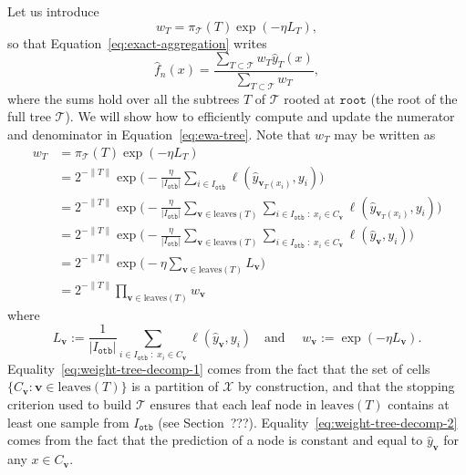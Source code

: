 \documentclass{article}
\newcommand{\wh}{\widehat}
\newcommand{\pp}{\; : \; }
\newcommand{\cX}{\mathcal X}
\newcommand{\otb}{\mathtt{otb}}
\newcommand{\pred}{\widehat{y}}
\newcommand{\node}{\mathbf{v}} %
\newcommand{\leaves}{\mathrm{leaves}} %
\renewcommand{\root}{\mathtt{root}} %
\newcommand{\tree}{\mathcal{T}} %
\begin{document}
Let us introduce 
\begin{equation*}
w_T = \pi_\tree (T) \exp (- \eta L_T),
\end{equation*}
so that Equation~\eqref{eq:exact-aggregation} writes
\begin{equation}
\label{eq:ewa-tree}
\wh f_n(x) = \frac{\sum_{T \subset \tree} w_T \pred_{T} (x)}{\sum_{T \subset \tree} w_T},
\end{equation}
where the sums hold over all the subtrees $T$ of $\tree$ rooted at $\root$ (the root of the full tree $\tree$).
We will show how to efficiently compute and update the numerator and denominator in Equation~\eqref{eq:ewa-tree}.
Note that $w_T$ may be written as
\begin{align}
    \nonumber
    w_T &= \pi_\tree (T) \exp(- \eta L_T) \\
    \nonumber
    &= 2^{-\| T \|} \exp \bigg(- \frac{\eta}{|I_\otb|} \sum_{i \in I_\otb} \ell (\pred_{\node_T(x_i)}, y_i) \bigg) \\
    \label{eq:weight-tree-decomp-1} 
    &= 2^{-\| T \|} \exp \bigg(- \frac{\eta}{|I_\otb|} \sum_{\node \in \leaves(T)} 
    \sum_{i \in I_\otb \pp x_i \in C_\node} \ell (\pred_{\node_T(x_i)}, y_i) \bigg) \\
    \label{eq:weight-tree-decomp-2}
    &= 2^{-\| T \|} \exp \bigg(- \frac{\eta}{|I_\otb|} \sum_{\node \in \leaves(T)} 
    \sum_{i \in I_\otb \pp x_i \in C_\node} \ell (\pred_{\node}, y_i) \bigg) \\
    \nonumber
    &= 2^{-\| T \|} \exp \bigg(- \eta \sum_{\node \in \leaves(T)} L_\node \bigg) \\
    \label{eq:weight-tree-decomp-3}
    &= 2^{-\| T \|} \prod_{\node \in \leaves(T)} w_{\node}
\end{align}
where
\begin{equation}
    \label{eq:node_loss_and_weight}
 L_\node := \frac{1}{|I_\otb|} \sum_{i \in I_\otb \pp x_i \in C_\node} \ell (\pred_{\node}, y_i)
 \quad \text{and } \quad w_\node := \exp(-\eta L_\node).
\end{equation}
Equality~\eqref{eq:weight-tree-decomp-1} comes from the fact that the set of cells $\{C_\node : \node \in \leaves(T) \}$ is a partition of $\cX$ by construction, and that the stopping criterion used to build $\tree$ ensures that each leaf node in $\leaves(T)$ contains at least one sample from $I_\otb$ (see Section~???).
Equality~\eqref{eq:weight-tree-decomp-2} comes from the fact that the prediction of a node is constant and equal to $\pred_\node$ for any $x \in C_\node$.
\end{document}
